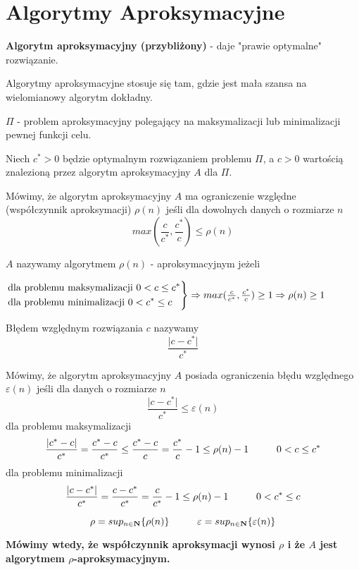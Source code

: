 \section{Algorytmy Aproksymacyjne}
\textbf{Algorytm aproksymacyjny (przybliżony)} - daje "prawie optymalne" rozwiązanie.

Algorytmy aproksymacyjne stosuje się tam, gdzie jest mała szansa na wielomianowy algorytm dokładny.

$\Pi$ - problem aproksymacyjny polegający na maksymalizacji lub minimalizacji pewnej funkcji celu.

Niech $c^{\ast} > 0$ będzie optymalnym rozwiązaniem problemu $\Pi$, a $c > 0$ wartością znalezioną przez algorytm aproksymacyjny $A$ dla $\Pi$.

Mówimy, że algorytm aproksymacyjny $A$ ma ograniczenie względne (współczynnik aproksymacji) $\rho (n)$ jeśli dla dowolnych danych o rozmiarze $n$ $$max(\frac{c}{c^{\ast}},\frac{c^{\ast}}{c}) \leq \rho (n)$$

$A$ nazywamy algorytmem $\rho(n)$ - aproksymacyjnym jeżeli 
\begin{center}
	$\begin{drcases}
		\text{dla problemu maksymalizacji } 0<c\leq c^{\ast}\\
		\text{dla problemu minimalizacji } 0<c^{\ast}\leq c
	\end{drcases} 
	\Rightarrow max(\frac{c}{c^{\ast}},\frac{c^{\ast}}{c})\geq 1 \Rightarrow \rho(n) \geq 1$
\end{center}

Błędem względnym rozwiązania $c$ nazywamy $$\frac{\vert c-c^{\ast} \vert}{c^{\ast}}$$

Mówimy, że algorytm aproksymacyjny $A$ posiada ograniczenia błędu  względnego $\varepsilon (n)$ jeśli dla danych o rozmiarze $n$ $$\frac{\vert c-c^{\ast}\vert}{c^{\ast}} \leq \varepsilon (n)$$ 
dla problemu maksymalizacji 
$$	\frac{\vert c^{\ast} - c\vert}{c^{\ast}} 
	= \frac{c^\ast - c}{c^\ast}
	\leq \frac{c^\ast - c}{c}
	= \frac{c^{\ast}}{c} - 1 
	\leq \rho(n) - 1 
	\hspace*{1cm} 0 < c \leq c^{\ast} $$
dla problemu minimalizacji 
$$	\frac{\vert c - c^{\ast}\vert}{c^{\ast}} 
	= \frac{c - c^{\ast}}{c^\ast} 
	= \frac{c}{c^{\ast}} - 1 
	\leq \rho(n) - 1 
	\hspace*{1cm} 0 < c^{\ast} \leq c $$

$$
\rho = sup_{n \in \mathbf{N}}
	\lbrace \rho(n) \rbrace 
\hspace*{1cm} 
\varepsilon = sup_{n \in \mathbf{N}} 
	\lbrace\varepsilon (n) \rbrace
$$

\textbf{Mówimy wtedy, że współczynnik aproksymacji wynosi $\rho$ i że $A$ jest algorytmem $\rho$-aproksymacyjnym.}